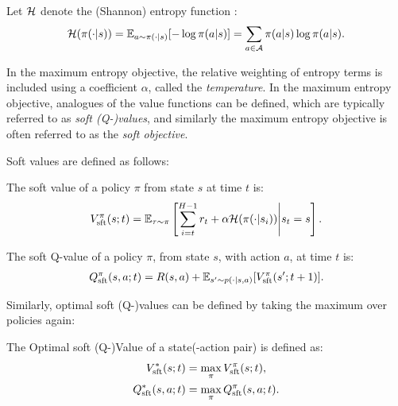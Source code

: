         Let $\mathcal{H}$ denote the (Shannon) entropy function \cite{entropy}:
        \begin{align}
            \mathcal{H}(\pi(\cdot|s)) = \mathbb{E}_{a\sim\pi(\cdot|s)}[-\log \pi(a|s)] = \sum_{a\in\mathcal{A}} \pi(a|s) \log \pi(a|s). \label{eq:shannon_entropy_def}
        \end{align}

        In the maximum entropy objective, the relative weighting of entropy terms is included using a coefficient $\alpha$, called the \textit{temperature}. In the maximum entropy objective, analogues of the value functions can be defined, which are typically referred to as \textit{soft (Q-)values}, and similarly the maximum entropy objective is often referred to as the \textit{soft objective}.

        Soft values are defined as follows:
        \begin{defn}
            \label{def:sft_value}
            \label{def:sft_q_value}
            The \textnormal{soft value} of a policy $\pi$ from state $s$ at time $t$ is:
            \begin{align}
                V_{{\textnormal{sft}}}^{\pi}(s;t) = \mathbb{E}_{\tau\sim\pi}\left[\sum_{i=t}^{H-1} r_t + \alpha\mathcal{H}(\pi(\cdot|s_i)) \Bigg| s_t=s \right]. \label{eq:sft_value_fn_def}
            \end{align} 

            The \textnormal{soft Q-value} of a policy $\pi$, from state $s$, with action $a$, at time $t$ is:
            \begin{align}
                Q_{{\textnormal{sft}}}^{\pi}(s,a;t) = R(s,a) + \mathbb{E}_{s'\sim p(\cdot|s,a)} [V_{{\textnormal{sft}}}^{\pi}(s';t+1)]. \label{eq:sft_q_value_fn_def}
            \end{align} 
        \end{defn}

        Similarly, optimal soft (Q-)values can be defined by taking the maximum over policies again:
        \begin{defn}
            \label{def:optimal_sft_value}
            \label{def:optimal_sft_q_value}
            The \textnormal{Optimal soft (Q-)Value} of a state(-action pair) is defined as:
            \begin{align}
                V_{{\textnormal{sft}}}^*(s;t) &= \max_{\pi} V_{{\textnormal{sft}}}^{\pi}(s;t), \label{eq:opt_soft_value_fn_def} \\
                Q_{{\textnormal{sft}}}^*(s,a;t) &= \max_{\pi} Q_{{\textnormal{sft}}}^{\pi}(s,a;t). \label{eq:opt_soft_q_value_fn_def}
            \end{align}
        \end{defn}

